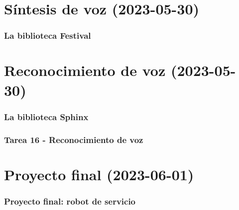 \section{Síntesis de voz (2023-05-30)}

\begin{frame}\frametitle{La biblioteca Festival}
\end{frame}

\section{Reconocimiento de voz (2023-05-30)}

\begin{frame}\frametitle{La biblioteca Sphinx}
\end{frame}

\begin{frame}\frametitle{Tarea 16 - Reconocimiento de voz}
\end{frame}


\section{Proyecto final (2023-06-01)}

\begin{frame}\frametitle{Proyecto final: robot de servicio}
\end{frame}
